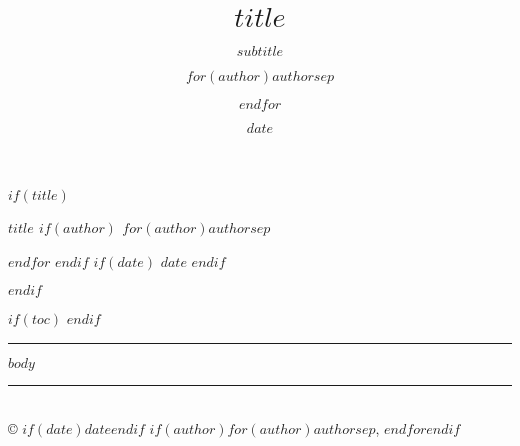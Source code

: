 \documentclass[$if(fontsize)$$fontsize$,$endif$$if(lang)$$babel-lang$,$endif$$if(papersize)$$papersize$,$endif$,11pt]{article}
\title{\sffamily\LARGE\bfseries\color{darkblue}$title$}
\subtitle{$subtitle$}
\author{$for(author)$$author$$sep$ \and $endfor$}
\date{$date$}
\begin{document}
$if(title)$
\begin{center}
\Huge\bfseries\sffamily\color{darkblue}$title$
\vspace{0.5cm}
$if(author)$
\Large\sffamily $for(author)$$author$$sep$ \par $endfor$
\vspace{0.3cm}
$endif$
$if(date)$
\large\sffamily $date$
$endif$
\end{center}
\vspace{1cm}
$endif$

$if(toc)$
\setcounter{tocdepth}{3}
\renewcommand{\contentsname}{Table of Contents}
\tableofcontents
\vspace{1cm}
$endif$

\vspace{0.5cm}
\rule{\textwidth}{1pt}
\vspace{0.5cm}

$body$

\vfill
\begin{center}
\rule{0.5\textwidth}{0.5pt}\\
\small\sffamily © $if(date)$$date$$endif$ $if(author)$$for(author)$$author$$sep$, $endfor$$endif$
\end{center}
\end{document}
